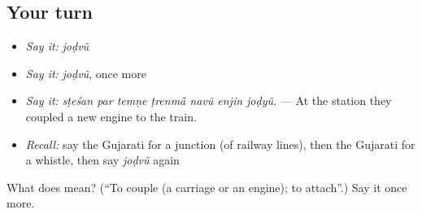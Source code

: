 \subsection*{Your turn}
\begin{itemize}
\raggedright
  \item \emph{Say it:} \emph{joḍvũ}
  \item \emph{Say it:} \emph{joḍvũ}, once more
  \item \emph{Say it:} \emph{sṭeśan par temṇe ṭrenmā̃ navũ enjin joḍyũ.} — At the station they coupled a new engine to the train.
  \item \emph{Recall:} say the Gujarati for a junction (of railway lines), then the Gujarati for a whistle, then say \emph{joḍvũ} again
\end{itemize}

\begin{tcolorbox}[breakable,colback=teal!4,colframe=teal!35!black,title={Before you move on}]
What does  mean? (\textquotedblleft{}To couple (a carriage or an engine); to attach\textquotedblright{}.) Say it once more.
\end{tcolorbox}
